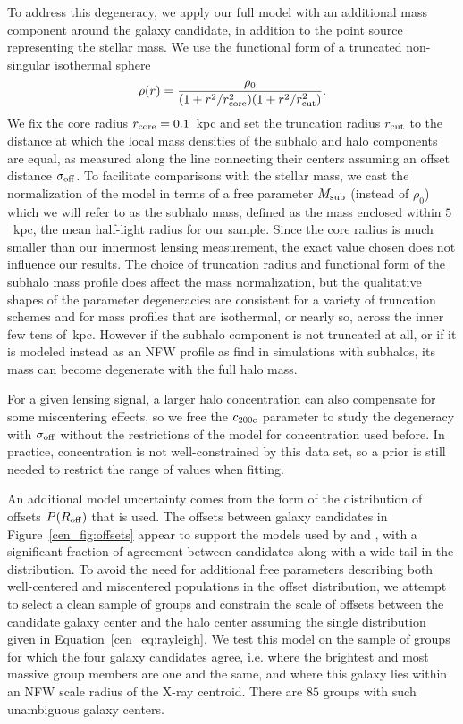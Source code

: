 To address this degeneracy, we apply our full model with an additional mass
component around the galaxy candidate, in addition to the point source
representing the stellar mass. We use the functional form of a
truncated non-singular isothermal sphere \citep{PastorMira2011}
\begin{equation}
\rho(r)=\frac{\rho_0}{(1+r^2/r_{\rm core}^2)(1+r^2/r_{\rm cut}^2)}.
\label{cen_eq:tnsi}
\end{equation}
We fix the core radius $r_{\rm core}=0.1$~{\rm kpc} and set the truncation
radius $r_{\rm cut}$ to the distance at which the local mass
densities of the subhalo and halo components are equal, as measured
along the line connecting their centers assuming an offset distance
$\sigma_{\rm off}$. To facilitate comparisons
with the stellar mass, we cast the normalization of the model in terms
of a free parameter $M_{\rm sub}$ (instead of $\rho_{0}$) which we
will refer to as the subhalo mass, defined as the mass enclosed within
$5$~{\rm kpc}, the mean half-light radius for our sample. Since the core
radius is much smaller than our innermost lensing measurement, the
exact value chosen does not influence our results. The choice of
truncation radius and functional form of the subhalo mass profile does
affect the mass normalization, but the qualitative shapes of the
parameter degeneracies are consistent for a variety of truncation
schemes and for mass profiles that are isothermal, or nearly so,
across the inner few tens of~{\rm kpc}. However if the subhalo
component is not truncated at all, or if it is modeled instead as an
NFW profile as \citeauthor{PastorMira2011} find in simulations with
subhalos, its mass can become degenerate with the full halo
mass.

For a given lensing signal, a larger halo concentration can also compensate
for some miscentering effects, so we free the $c_{\rm 200c}$ parameter
to study the degeneracy with $\sigma_{\rm off}$ without the
restrictions of the model for concentration used before. In practice,
concentration is not well-constrained by this data set, so a prior is still
needed to restrict the range of values when fitting.

An additional model uncertainty comes from the form of the
distribution of offsets $P(R_{\rm off})$ that is used. The offsets
between galaxy candidates in Figure~\ref{cen_fig:offsets} appear to
support the models used by \citet{Johnston2007b} and \citet{Oguri2010},
with a significant fraction of agreement between candidates along with
a wide tail in the distribution. To avoid the need for additional free
parameters describing both well-centered and miscentered populations in the offset distribution,
we attempt to select a clean sample of groups and constrain the scale
of offsets between the candidate galaxy center and the halo center
assuming the single distribution given in
Equation~\eqref{cen_eq:rayleigh}. We test this model on the sample of
groups for which the four galaxy candidates agree, i.e. where the
brightest and most massive group members are one and the same, and
where this galaxy lies within an NFW scale radius of the X-ray
centroid. There are $85$ groups with such unambiguous galaxy centers.

